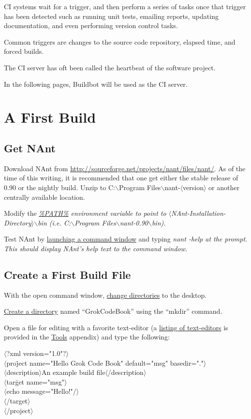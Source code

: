 \gls{CI} systems wait for a trigger, and then perform a series of tasks once that trigger has been detected such as running unit tests,
emailing reports, updating documentation, and even performing version control tasks.

Common triggers are changes to the source code repository, elapsed time, and forced builds.

The \gls{CI} server has oft been called the heartbeat of the software project.

In the following pages, \gls{Buildbot} will be used as the CI server.

\section{A First Build}

\subsection{Get NAnt}
Download \gls{NAnt} from \url{http://sourceforge.net/projects/nant/files/nant/}. As of the time of this writing, it is recommended that one get
either the stable release of 0.90 or the nightly build. Unzip to C:$\backslash$Program Files$\backslash$nant-$\langle$version$\rangle$ or another centrally available 
location.

Modify the \em \hyperref[path]{\%PATH\%} \em environment variable to point to $\langle$NAnt-Installation-Directory$\rangle$$\backslash$bin (i.e. C:$\backslash$Program Files$\backslash$nant-0.90$\backslash$bin).

Test NAnt by \hyperref[launch-command-window]{launching a command window} and typing \em nant -help \em at the prompt. This should display NAnt's help text to the command window.

\subsection{Create a First Build File}
With the open command window, \hyperref[change-directories]{change directories} to the desktop.

\hyperref[create-directory]{Create a directory} named ``GrokCodeBook'' using the ``mkdir'' command.

Open a file for editing with a favorite \gls{text-editor} (a \hyperref[text-editors]{listing of text-editors} is provided in the \hyperref[tools]{Tools} appendix) and type the following:

\begin{tabbing}
$\langle$?xml version="1.0"?$\rangle$ \\
$\langle$pro\=ject name="Hello Grok Code Book" default="msg" basedir="."$\rangle$ \\
\>$\langle$description$\rangle$An example build file$\langle$/description$\rangle$ \\
\>$\langle$tar\=get name="msg"$\rangle$ \\
\>\>$\langle$echo message="Hello!"/$\rangle$ \\
\>$\langle$/target$\rangle$ \\
$\langle$/project$\rangle$
\end{tabbing}

